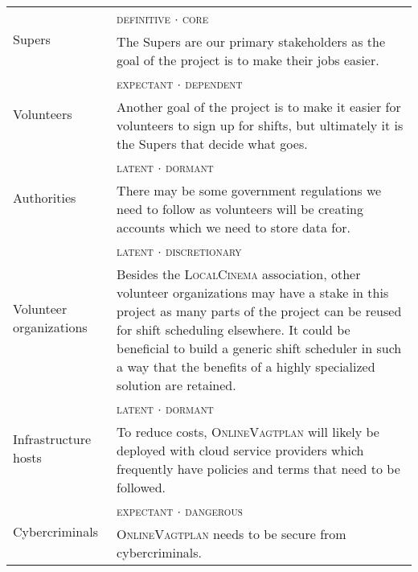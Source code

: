 \begingroup
\renewcommand{\arraystretch}{1.1}
\renewcommand{\multirowsetup}{\raggedleft\bfseries}
\noindent\begin{tabularx}{\linewidth}{p{8em}X}
	\toprule
	\multirow[t]{2}{=}{Supers}
	 & \scshape definitive $\cdot$ core
	\\ &
	The Supers are our primary stakeholders
	as the goal of the project is to make their jobs easier.
	\\ \midrule
	\multirow[t]{2}{=}{Volunteers}
	 & \scshape expectant $\cdot$ dependent
	\\ &
	Another goal of the project is
	to make it easier for volunteers to sign up for shifts,
	but ultimately it is the Supers that decide what goes.
	\\ \midrule
	\multirow[t]{2}{=}{Authorities}
	 & \scshape latent $\cdot$ dormant
	\\ &
	There may be some government regulations we need to follow
	as volunteers will be creating accounts
	which we need to store data for.
	\\ \midrule
	\multirow[t]{2}{=}{Volunteer organizations}
	 & \scshape latent $\cdot$ discretionary
	\\ &
	Besides the \textsc{LocalCinema} association,
	other volunteer organizations may have a stake in this project
	as many parts of the project can be reused for shift scheduling elsewhere.
	It could be beneficial to build a generic shift scheduler
	in such a way that the benefits of a highly specialized solution are retained.%
	\\ \midrule
	\multirow[t]{2}{=}{Infrastructure hosts}
	 & \scshape latent $\cdot$ dormant
	\\ &
	To reduce costs,
	\textsc{OnlineVagtplan} will likely be deployed with cloud service providers
	which frequently have policies and terms that need to be followed.
	\\ \midrule
	\multirow[t]{2}{=}{Cybercriminals}
	 & \scshape expectant $\cdot$ dangerous
	\\ &
	\textsc{OnlineVagtplan} needs to be secure from cybercriminals.
	\\ \bottomrule
\end{tabularx}
\endgroup

